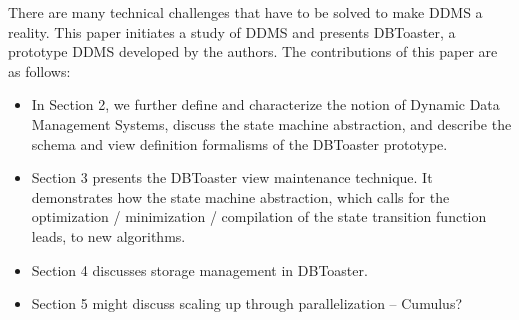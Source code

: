 There are many technical challenges that have to be solved to make DDMS a reality. This paper initiates a study of DDMS and presents DBToaster, a prototype DDMS developed by the authors. The contributions of this paper are as follows:

\begin{itemize}
\item 
In Section 2, we further define and characterize the notion of Dynamic Data Management Systems, discuss the state machine abstraction, and describe the schema and view definition formalisms of the DBToaster prototype.

\item
Section 3 presents the DBToaster view maintenance technique. It demonstrates how the state machine abstraction, which calls for the optimization / minimization / compilation of the state transition function leads, to new algorithms.

\item
Section 4 discusses storage management in DBToaster.

\item
Section 5 might discuss scaling up through parallelization -- Cumulus?
\end{itemize}

